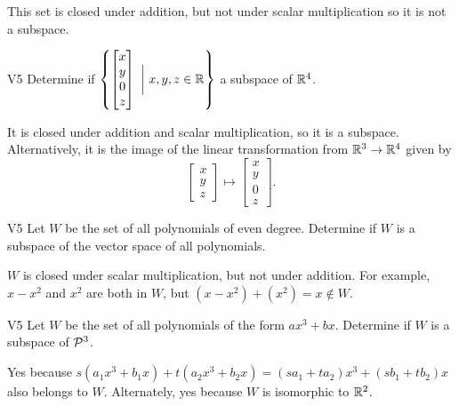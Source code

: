 \begin{solution}
This set is closed under addition, but not under scalar multiplication so it is not a subspace.
\end{solution}

\begin{problem}{V5}
Determine if \(\left\{ \begin{bmatrix} x \\ y \\ 0 \\ z \end{bmatrix}\  \bigg|\ x,y,z \in \IR\right\}\)  a subspace of \(\IR^4\).
\end{problem}
\begin{solution}
It is closed under addition and scalar multiplication, so it is a subspace.  Alternatively, it is the image of the linear transformation from \(\IR^3 \rightarrow \IR^4\) given by \[\begin{bmatrix} x \\ y \\ z \end{bmatrix} \mapsto  \begin{bmatrix} x \\ y \\ 0 \\ z \end{bmatrix}.\]
\end{solution}


\begin{problem}{V5} Let \(W\) be the set of all polynomials of even degree.  Determine if \(W\) is a subspace of the vector space of all polynomials.
\end{problem}
\begin{solution}
\(W\) is closed under scalar multiplication, but not under addition.  For example, \(x-x^2\) and \(x^2\) are both in \(W\), but \((x-x^2)+(x^2)=x \notin W\).
\end{solution}


\begin{problem}{V5} Let \(W\) be the set of all polynomials of the form
\(ax^3+bx\).  Determine if \(W\) is a subspace of \(\P^3\).
\end{problem}
\begin{solution}
Yes because \(s(a_1x^3+b_1x)+t(a_2x^3+b_2x)=
(sa_1+ta_2)x^3+(sb_1+tb_2)x\) also belongs to \(W\).
Alternately, yes because \(W\) is isomorphic to \(\IR^2\).
\end{solution}


